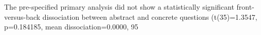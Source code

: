 The pre-specified primary analysis did not show a statistically significant front-versus-back dissociation between abstract and concrete questions (t(35)=1.3547, p=0.184185, mean dissociation=0.0000, 95%

